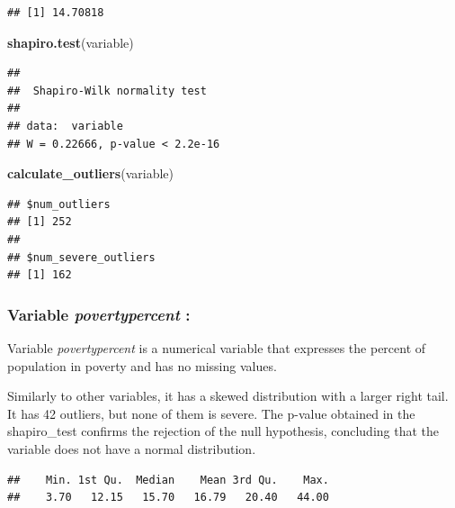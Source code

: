 \documentclass[
]{article}
\newenvironment{Shaded}{\begin{snugshade}}{\end{snugshade}}
\newcommand{\FunctionTok}[1]{\textcolor[rgb]{0.13,0.29,0.53}{\textbf{#1}}}
\newcommand{\NormalTok}[1]{#1}
\newcommand{\OtherTok}[1]{\textcolor[rgb]{0.56,0.35,0.01}{#1}}
\newcommand{\SpecialCharTok}[1]{\textcolor[rgb]{0.81,0.36,0.00}{\textbf{#1}}}
\begin{document}
\begin{verbatim}
## [1] 14.70818
\end{verbatim}

\begin{Shaded}
\begin{Highlighting}[]
\FunctionTok{shapiro.test}\NormalTok{(variable)}
\end{Highlighting}
\end{Shaded}

\begin{verbatim}
## 
##  Shapiro-Wilk normality test
## 
## data:  variable
## W = 0.22666, p-value < 2.2e-16
\end{verbatim}

\begin{Shaded}
\begin{Highlighting}[]
\FunctionTok{calculate\_outliers}\NormalTok{(variable)}
\end{Highlighting}
\end{Shaded}

\begin{verbatim}
## $num_outliers
## [1] 252
## 
## $num_severe_outliers
## [1] 162
\end{verbatim}

\subsubsection{\texorpdfstring{Variable \emph{povertypercent}
:}{Variable povertypercent :}}\label{variable-povertypercent}

Variable \emph{povertypercent} is a numerical variable that expresses
the percent of population in poverty and has no missing values.

Similarly to other variables, it has a skewed distribution with a larger
right tail. It has 42 outliers, but none of them is severe. The p-value
obtained in the shapiro\_test confirms the rejection of the null
hypothesis, concluding that the variable does not have a normal
distribution.

\begin{Shaded}
\end{Shaded}

\begin{verbatim}
##    Min. 1st Qu.  Median    Mean 3rd Qu.    Max. 
##    3.70   12.15   15.70   16.79   20.40   44.00
\end{verbatim}
\end{document}
